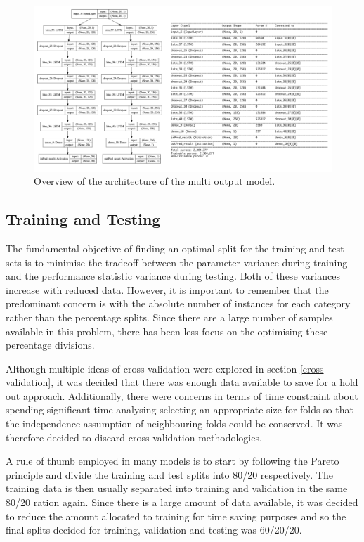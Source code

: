 \documentclass[10pt,onecolumn,letterpaper]{article}
\begin{document}
\begin{figure}[!htb]
\centering
\includegraphics[width=17.5cm]{multi_output.png}
\caption{Overview of the architecture of the multi output model.}
\end{figure}

\newpage

\subsection{Training and Testing} 

The fundamental objective of finding an optimal split for the training and test sets is to minimise the tradeoff between the parameter variance during training and the performance statistic variance during testing. Both of these variances increase with reduced data. However, it is important to remember that the predominant concern is with the absolute number of instances for each category rather than the percentage splits. Since there are a large number of samples available in this problem, there has been less focus on the optimising these percentage divisions. 

Although multiple ideas of cross validation were explored in section \ref{cross validation}, it was decided that there was enough data available to save for a hold out approach. Additionally, there were concerns in terms of time constraint about spending significant time analysing selecting an appropriate size for folds so that the independence assumption of neighbouring folds could be conserved. It was therefore decided to discard cross validation methodologies.

A rule of thumb employed in many models is to start by following the Pareto principle and divide the training and test splits into 80/20 respectively. The training data is then usually separated into training and validation in the same 80/20 ration again. Since there is a large amount of data available, it was decided to reduce the amount allocated to training for time saving purposes and so the final splits decided for training, validation and testing was 60/20/20.
\end{document}

